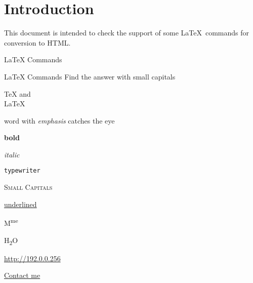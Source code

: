\documentclass{article}
\begin{document}
\section*{Introduction}

This document is intended to check the support of some \LaTeX\ commands for 
conversion to HTML.

\begin{quiz}[points=1]{LaTeX Commands}
\begin{multi}{LaTeX Commands}
Find the answer with small capitals
\item \TeX{} and\\\relax \LaTeX%
\item word with \emph{emphasis} catches the eye
\item \textbf{bold}
\item \textit{italic}
\item \texttt{typewriter}
\item* \textsc{Small Capitals}
\item \underline{underlined}
\item M\textsuperscript{me}
\item H\textsubscript{2}O
\item \url{http://192.0.0.256}
\item \href{mailto:name@server.com}{Contact me}
\end{multi}

\end{quiz}
\end{document}
